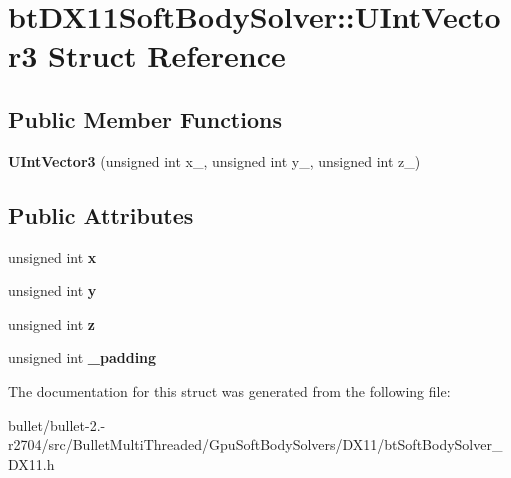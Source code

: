\hypertarget{structbt_d_x11_soft_body_solver_1_1_u_int_vector3}{\section{bt\+D\+X11\+Soft\+Body\+Solver\+:\+:U\+Int\+Vector3 Struct Reference}
\label{structbt_d_x11_soft_body_solver_1_1_u_int_vector3}
}
\subsection*{Public Member Functions}
\begin{DoxyCompactItemize}
\item 
\hypertarget{structbt_d_x11_soft_body_solver_1_1_u_int_vector3_a60fbe4748f41c1043082b9e4d70b1421}{{\bfseries U\+Int\+Vector3} (unsigned int x\+\_\+, unsigned int y\+\_\+, unsigned int z\+\_\+)}\label{structbt_d_x11_soft_body_solver_1_1_u_int_vector3_a60fbe4748f41c1043082b9e4d70b1421}

\end{DoxyCompactItemize}
\subsection*{Public Attributes}
\begin{DoxyCompactItemize}
\item 
\hypertarget{structbt_d_x11_soft_body_solver_1_1_u_int_vector3_ab08b2a5d0d7da85e784d0e67f755529e}{unsigned int {\bfseries x}}\label{structbt_d_x11_soft_body_solver_1_1_u_int_vector3_ab08b2a5d0d7da85e784d0e67f755529e}

\item 
\hypertarget{structbt_d_x11_soft_body_solver_1_1_u_int_vector3_a49229c84fecb12d7fdfa31a3c89d819c}{unsigned int {\bfseries y}}\label{structbt_d_x11_soft_body_solver_1_1_u_int_vector3_a49229c84fecb12d7fdfa31a3c89d819c}

\item 
\hypertarget{structbt_d_x11_soft_body_solver_1_1_u_int_vector3_a553a4c048c91046b206d642db0b4c17d}{unsigned int {\bfseries z}}\label{structbt_d_x11_soft_body_solver_1_1_u_int_vector3_a553a4c048c91046b206d642db0b4c17d}

\item 
\hypertarget{structbt_d_x11_soft_body_solver_1_1_u_int_vector3_a809fa9a0399c7c06785ab0430744e236}{unsigned int {\bfseries \+\_\+padding}}\label{structbt_d_x11_soft_body_solver_1_1_u_int_vector3_a809fa9a0399c7c06785ab0430744e236}

\end{DoxyCompactItemize}


The documentation for this struct was generated from the following file\+:\begin{DoxyCompactItemize}
\item 
bullet/bullet-\/2.-\/r2704/src/\+Bullet\+Multi\+Threaded/\+Gpu\+Soft\+Body\+Solvers/\+D\+X11/bt\+Soft\+Body\+Solver\+\_\+\+D\+X11.\+h\end{DoxyCompactItemize}
